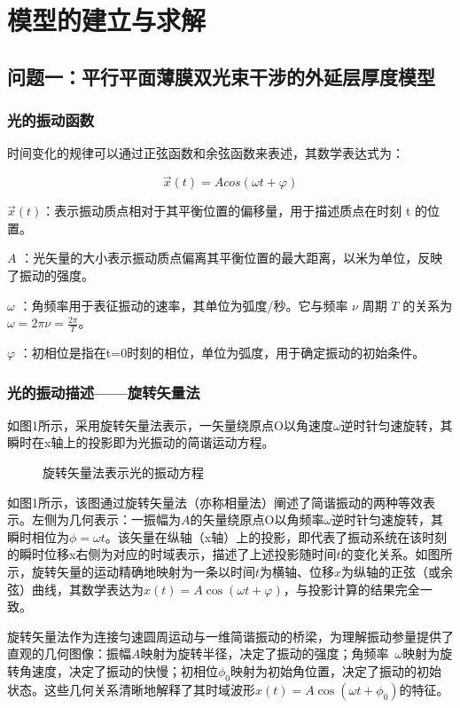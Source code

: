 \documentclass{ctexart}
\begin{document}
\section{模型的建立与求解}

\subsection{问题一：平行平面薄膜双光束干涉的外延层厚度模型}

\subsubsection{光的振动函数}
时间变化的规律可以通过正弦函数和余弦函数来表述，其数学表达式为：

\[\overrightarrow{x}(t) = Acos(\omega t + \varphi)\]

\(\overrightarrow{x}(t)\)：表示振动质点相对于其平衡位置的偏移量，用于描述质点在时刻 t 的位置。

\(A\) ：光矢量的大小表示振动质点偏离其平衡位置的最大距离，以米为单位，反映了振动的强度。

\(\omega\) ：角频率用于表征振动的速率，其单位为弧度/秒。它与频率 \(\nu\) 周期 \(T\) 的关系为 \(\omega = 2\pi\nu = \frac{2\pi}{T}\)。

\(\varphi\) ：初相位是指在t=0时刻的相位，单位为弧度，用于确定振动的初始条件。

\subsubsection{光的振动描述——旋转矢量法}
如图1所示，采用旋转矢量法表示，一矢量绕原点O以角速度$\omega$逆时针匀速旋转，其瞬时在x轴上的投影即为光振动的简谐运动方程。

\begin{figure}[ht]
    \centering
    \fbox{\rule{2cm}{0pt} \rule{0pt}{2cm}} %
    \caption{旋转矢量法表示光的振动方程}
    \label{fig:1}
\end{figure}

如图1所示，该图通过旋转矢量法（亦称相量法）阐述了简谐振动的两种等效表示。左侧为几何表示：一振幅为$A$的矢量绕原点O以角频率$\omega$逆时针匀速旋转，其瞬时相位为$\phi=\omega t$。该矢量在纵轴（x轴）上的投影，即代表了振动系统在该时刻的瞬时位移x右侧为对应的时域表示，描述了上述投影随时间$t$的变化关系。如图所示，旋转矢量的运动精确地映射为一条以时间$t$为横轴、位移$x$为纵轴的正弦（或余弦）曲线，其数学表达为$x(t)=A\cos(\omega t+\varphi)$，与投影计算的结果完全一致。

旋转矢量法作为连接匀速圆周运动与一维简谐振动的桥梁，为理解振动参量提供了直观的几何图像：振幅$A$映射为旋转半径，决定了振动的强度；角频率 $\omega$映射为旋转角速度，决定了振动的快慢；初相位$\phi_0$映射为初始角位置，决定了振动的初始状态。这些几何关系清晰地解释了其时域波形$x(t)=A\cos(\omega t+\phi_0)$的特征。
\end{document}
